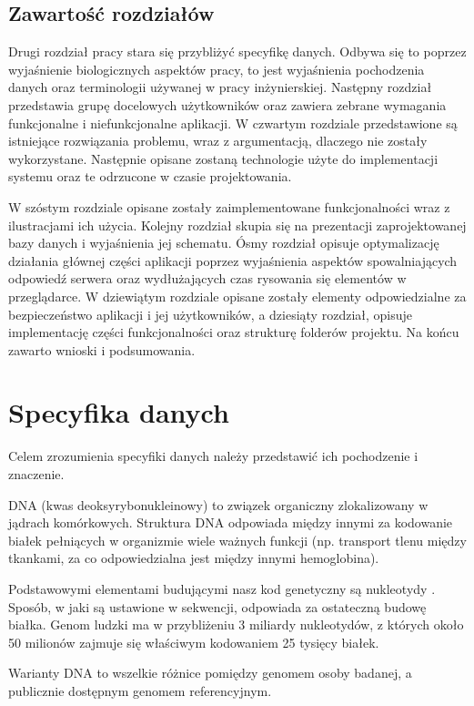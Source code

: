 \documentclass[a4paper,12pt,twoside]{article}
\begin{document}
\subsection{Zawartość rozdziałów}
Drugi rozdział pracy stara się przybliżyć specyfikę danych.
Odbywa się to poprzez wyjaśnienie biologicznych aspektów pracy, to jest
wyjaśnienia pochodzenia danych oraz terminologii używanej w pracy inżynierskiej.
Następny rozdział przedstawia grupę docelowych użytkowników oraz zawiera zebrane wymagania funkcjonalne i niefunkcjonalne aplikacji.
W czwartym rozdziale przedstawione są istniejące rozwiązania problemu, wraz
z argumentacją, dlaczego nie zostały wykorzystane.
Następnie opisane zostaną technologie użyte do implementacji systemu oraz te odrzucone w czasie projektowania.

W szóstym rozdziale opisane zostały zaimplementowane funkcjonalności
wraz z ilustracjami ich użycia. Kolejny rozdział skupia się
na prezentacji zaprojektowanej bazy danych i wyjaśnienia
jej schematu. Ósmy rozdział opisuje optymalizację działania głównej
części aplikacji poprzez wyjaśnienia aspektów spowalniających
odpowiedź serwera oraz wydłużających czas rysowania się elementów w
przeglądarce.
W dziewiątym rozdziale opisane zostały elementy odpowiedzialne za
bezpieczeństwo aplikacji i jej użytkowników, a dziesiąty rozdział,
opisuje implementację części funkcjonalności oraz strukturę folderów projektu.
Na końcu zawarto wnioski i podsumowania.

\newpage
\section{Specyfika danych}
Celem zrozumienia specyfiki danych należy przedstawić ich pochodzenie
i znaczenie.

DNA (kwas deoksyrybonukleinowy) \cite{dna} to związek organiczny zlokalizowany w jądrach komórkowych.
Struktura DNA odpowiada między innymi za kodowanie białek \cite{geneticCode} pełniących w organizmie wiele ważnych funkcji (np. transport tlenu między tkankami, za co
odpowiedzialna jest między innymi hemoglobina).

Podstawowymi elementami budującymi nasz kod genetyczny są
nukleotydy \cite{nukleotydy}. Sposób, w jaki są ustawione w sekwencji, odpowiada
za ostateczną budowę białka. Genom ludzki ma w przybliżeniu 3 miliardy
nukleotydów, z których około 50 milionów zajmuje się właściwym kodowaniem
25 tysięcy białek.

Warianty DNA to wszelkie różnice pomiędzy genomem osoby badanej,
a publicznie dostępnym genomem referencyjnym.
\end{document}
